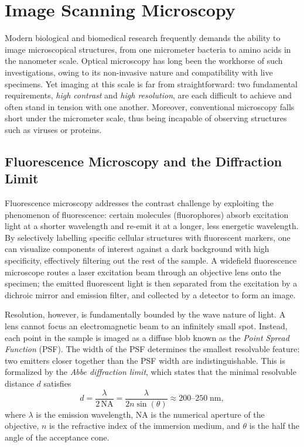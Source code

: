 \section{Image Scanning Microscopy}

Modern biological and biomedical research frequently demands the ability to image
microscopical structures, from one micrometer bacteria to amino acids in the nanometer scale. Optical microscopy has long been
the workhorse of such investigations, owing to its non-invasive nature and compatibility
with live specimens. Yet imaging at this scale is far from straightforward: two
fundamental requirements, \textit{high contrast} and \textit{high resolution}, are
each difficult to achieve and often stand in tension with one another. Moreover, conventional microscopy falls short under the micrometer scale, thus being incapable of observing structures such as viruses or proteins.

\subsection{Fluorescence Microscopy and the Diffraction Limit}

Fluorescence microscopy addresses the contrast challenge by exploiting the phenomenon of fluorescence: certain molecules (fluorophores) absorb excitation light at a shorter wavelength and re-emit it at a longer, less energetic wavelength. By selectively labelling specific cellular structures with fluorescent markers, one can visualize components of interest against a dark background with high specificity, effectively filtering out the rest of the sample. A widefield fluorescence microscope routes a laser excitation beam through an objective lens onto the specimen; the emitted fluorescent light is then separated from the excitation by a dichroic mirror and emission filter, and collected by a detector to form an image.

Resolution, however, is fundamentally bounded by the wave nature of light. A lens cannot focus an electromagnetic beam to an infinitely small spot. Instead, each point in the sample is imaged as a diffuse blob known as the \textit{Point Spread Function} (PSF). The width of the PSF determines the smallest resolvable feature: two emitters closer together than the PSF width are indistinguishable. This is formalized by the \textit{Abbe diffraction limit}, which states that the minimal resolvable distance $d$ satisfies
\begin{equation}
    d = \frac{\lambda}{2 \, \mathrm{NA}} = \frac{\lambda}{2 n \sin(\theta)}
    \approx 200\text{--}250 \; \text{nm},
\end{equation}
where $\lambda$ is the emission wavelength, $\mathrm{NA}$ is the numerical aperture of the objective, $n$ is the refractive index of the immersion medium, and $\theta$ is the half the angle of the acceptance cone. 

